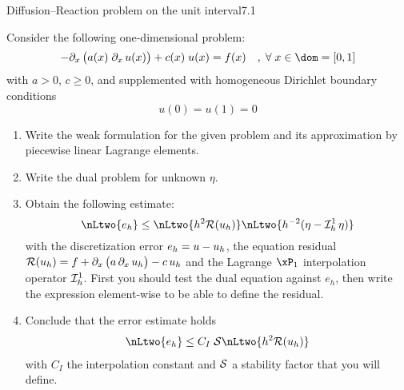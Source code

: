 \begin{tmaxrcs}{Diffusion--Reaction problem on the unit interval}{7.1}

Consider the following one-dimensional problem:
\begin{equation*}
- \pdx\bigl(a(x)\;\pdx u(x)\bigr) + c(x)\;u(x) = f(x)\quad,\;\forany x\in \dom = [0,1]
\end{equation*}
with $a > 0$, $c \geq 0$, and supplemented with homogeneous Dirichlet boundary conditions
\begin{equation*}
u(0) = u(1) = 0
\end{equation*}
\begin{enumerate}
\item Write the weak formulation for the given problem and its approximation by piecewise linear Lagrange elements.
\item Write the dual problem for unknown $\eta$.
\item Obtain the following estimate:
\begin{equation*}
\nLtwo{e_h} \leq \nLtwo{h^2 \Res \uh} \nLtwo{h^{-2} (\eta - \Lgrh{1}\eta)}
\end{equation*}
with the discretization error $e_h = u - {u_h}$, the equation residual ${\mathcal{R}({u_h})} = f + \partial_{x}\,\bigl(a\,\partial_{x}\, {u_h}\bigr) - c\,{u_h}$ and the Lagrange $\xPone$ interpolation operator $\mathop{\mathcal{I}_{h}^{1}}$. First you should test the dual equation against $e_h$, then write the expression element-wise to be able to define the residual.
\item Conclude that the \aposteriori error estimate holds
\begin{eqnarray*}
\nLtwo{e_h} \leq C_I\;\Stab\nLtwo{h^2\Res \uh}
\end{eqnarray*}
with $C_I$ the interpolation constant and $\mathcal{S}$ a stability factor that you will define.
\end{enumerate}
\end{tmaxrcs}


